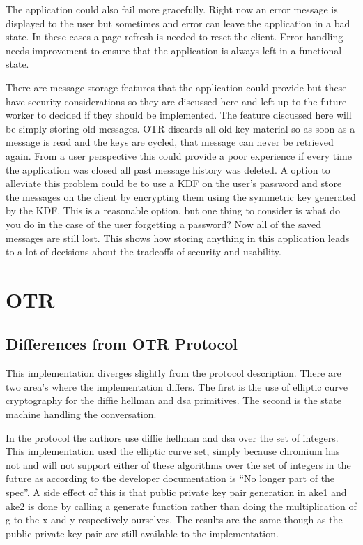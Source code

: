 The application could also fail more gracefully. Right now an error message is displayed to the user but sometimes and error can leave the application in a bad state. In these cases a page refresh is needed to reset the client. Error handling needs improvement to ensure that the application is always left in a functional state.


There are message storage features that the application could provide but these have security considerations so they are discussed here and left up to the future worker to decided if they should be implemented. The feature discussed here will be simply storing old messages. OTR discards all old key material so as soon as a message is read and the keys are cycled, that message can never be retrieved again. From a user perspective this could provide a poor experience if every time the application was closed all past message history was deleted. A option to alleviate this problem could be to use a KDF on the user's password and store the messages on the client by encrypting them using the symmetric key generated by the KDF. This is a reasonable option, but one thing to consider is what do you do in the case of the user forgetting a password? Now all of the saved messages are still lost. This shows how storing anything in this application leads to a lot of decisions about the tradeoffs of security and usability.


\section{OTR}


\subsection{Differences from OTR Protocol}


This implementation diverges slightly from the protocol description. \cite{otr-protocol} There are two area’s where the implementation differs. The first is the use of elliptic curve cryptography for the diffie hellman and dsa primitives. The second is the state machine handling the conversation.


In the protocol the authors use diffie hellman and dsa over the set of integers. This implementation used the elliptic curve set, simply because chromium has not and will not support either of these algorithms over the set of integers in the future as according to the developer documentation is “No longer part of the spec”. \cite{webcrypto-chromium}
A side effect of this is that public private key pair generation in ake1 and ake2 is done by calling a generate function rather than doing the multiplication of g to the x and y respectively ourselves. The results are the same though as the public private key pair are still available to the implementation.  


